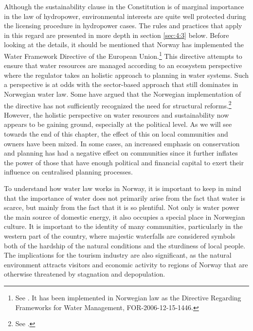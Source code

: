 Although the sustainability clause in the Constitution is of marginal importance in the law of hydropower, environmental interests are quite well protected during the licensing procedure in hydropower cases. The rules and practices that apply in this regard are presented in more depth in section \ref{sec:4:3} below. Before looking at the details, it should be mentioned that Norway has implemented the Water Framework Directive of the European Union.\footnote{See \cite{water00}. It has been implemented in Norwegian law as the Directive Regarding Frameworks for Water Management, FOR-2006-12-15-1446.} This directive attempts to ensure that water resources are managed according to an ecosystem perspective where the regulator takes an holistic approach to planning in water systems. Such a perspective is at odds with the sector-based approach that still dominates in Norwegian water law. Some have argued that the Norwegian implementation of the directive has not sufficiently recognized the need for structural reforms.\footnote{See \cite{hanssen14}.} However, the holistic perspective on water resources and sustainability now appears to be gaining ground, especially at the political level. As we will see towards the end of this chapter, the effect of this on local communities and owners have been mixed. In some cases, an increased emphasis on conservation and planning has had a negative effect on communities since it further inflates the power of those that have enough political and financial capital to exert their influence on centralised planning processes. %

To understand how water law works in Norway, it is important to keep in mind that the importance of water does not primarily arise from the fact that water is scarce, but mainly from the fact that it is so plentiful. Not only is water power the main source of domestic energy, it also occupies a special place in Norwegian culture. It is important to the identity of many communities, particularly in the western part of the country, where majestic waterfalls are considered symbols both of the hardship of the natural conditions and the sturdiness of local people. The implications for the tourism industry are also significant, as the natural environment attracts visitors and economic activity to regions of Norway that are otherwise threatened by stagnation and depopulation.

